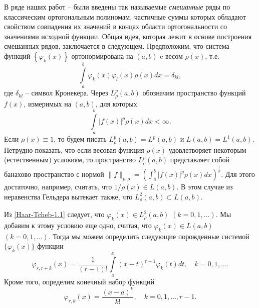 В ряде наших работ  \cite{Haar-Tcheb-Shar11} -- \cite{Haar-Tcheb-Shar18}  были введены так называемые \textit{смешанные} ряды по классическим ортогональным полиномам, частичные суммы которых  обладают свойством совпадения их значений в концах области ортогональности  со значениями исходной функции. Общая идея, которая лежит в основе построения смешанных рядов, заключается в следующем. Предположим, что система функций  $\left\{\varphi_k(x)\right\}$ ортонормирована  на $(a,b)$  c весом   $\rho(x)$, т.е.
 \begin{equation}\label{Haar-Tcheb-1.1}
\int\limits_a^b\varphi_k(x)\varphi_l(x)\rho(x)dx=\delta_{kl},
\end{equation}
где $\delta_{kl}$ -- символ Кронекера. Через $L^p_\rho(a,b)$ обозначим пространство  функций $f(x)$, измеримых  на  $(a,b)$, для которых
 \begin{equation}\label{Haar-Tcheb-1.2}
\int\limits_a^b|f(x)|^p\rho(x)dx<\infty.
\end{equation}
Если $\rho(x)\equiv1$, то будем писать $L^p_\rho(a,b)=L^p(a,b)$ и $L(a,b)=L^1(a,b)$. Нетрудно показать, что если весовая функция $\rho(x)$ удовлетворяет некоторым (естественным) условиям, то пространство $L^p_\rho(a,b)$ представляет собой банахово пространство с нормой $\|f\|_{p,\rho}=(\int_a^b|f(x)|^p\rho(x)dx)^\frac1p$. Для этого достаточно, например, считать, что $1/\rho(x)\in L(a,b)$. В этом случае из  неравенства Гельдера вытекает также, что $L^2_\rho(a,b)\subset L(a,b)$.

Из \eqref{Haar-Tcheb-1.1} следует, что $\varphi_k(x)\in L^2_\rho(a,b)$ $(k=0,1,\ldots)$. Мы добавим к этому условию еще одно, считая, что $\varphi_k(x)\in L(a,b)$ $(k=0,1,\ldots)$. Тогда мы можем определить следующие порожденные системой $\{\varphi_k(x)\}$ функции
 \begin{equation}\label{Haar-Tcheb-1.3}
\varphi_{r,r+k}(x) =\frac{1}{(r-1)!}\int\limits_a^x(x-t)^{r-1}\varphi_{k}(t)dt, \quad k=0,1,\ldots.
\end{equation}
 Кроме того, определим конечный набор функций
  \begin{equation}\label{Haar-Tcheb-1.4}
\varphi_{r,k}(x) =\frac{(x-a)^k}{k!}, \quad k=0,1,\ldots, r-1.
\end{equation}

